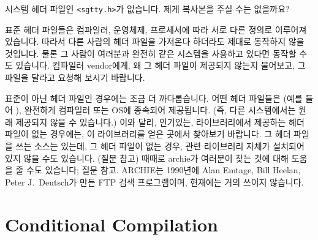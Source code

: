 \begin{faq}
	시스템 헤더 파일인 \verb+<sgtty.h>+가 없습니다.
	제게 복사본을 주실 수는 없을까요?

\A	표준 헤더 파일들은 컴파일러, 운영체제, 프로세서에 따라 서로 다른
	정의로 이루어져 있습니다. 따라서 다른 사람의 헤더 파일을
        가져온다 하더라도 제대로 동작하지 않을 것입니다. 물론 그 사람이
        여러분과 완전히 같은 시스템을 사용하고 있다면 동작할 수도 있습니다.
	컴파일러 vendor에게, 왜 그 헤더 파일이 제공되지 않는지 물어보고,
        그 파일을 달라고 요청해 보시기 바랍니다.

        표준이 아닌 헤더 파일인 경우에는 조금 더 까다롭습니다. 어떤
        헤더 파일들은 (예를 들어 ), 완전하게 컴파일러 또는
        OS에 종속되어 제공됩니다. (즉, 다른 시스템에서는 원래 제공되지 않을
        수 있습니다.) 이와 달리, 인기있는, 라이브러리에서 제공하는 헤더
        파일이 없는 경우에는, 이 라이브러리를 얻은 곳에서 찾아보기 바랍니다.
        그 헤더 파일을 쓰는 소스는 있는데, 그 헤더 파일이 없는 경우, 관련
        라이브러리 자체가 설치되어 있지 않을 수도 있습니다. (질문  참고)
        때때로 archie가 여러분이 찾는 것에 대해 도움을 줄 수도 있습니다;
        질문  참고.
\T
	ARCHIE는 1990년에 Alan Emtage, Bill Heelan, Peter J.\ Deutsch가 만든
        FTP 검색 프로그램이며, 현재에는 거의 쓰이지 않습니다.
\end{faq}

\section{Conditional Compilation}

